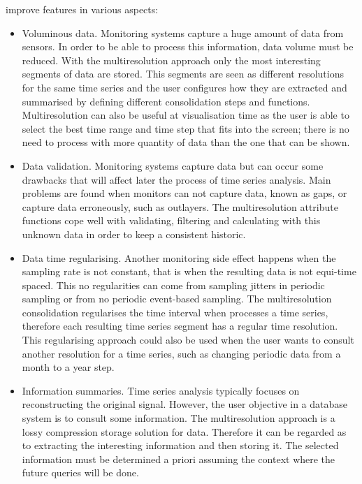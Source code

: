  improve  features in various aspects:
\begin{itemize}

\item Voluminous data. Monitoring systems capture a huge amount of
  data from sensors. In order to be able to process this information,
  data volume must be reduced. With the multiresolution approach only
  the most interesting segments of data are stored. This segments are
  seen as different resolutions for the same time series and the user
  configures how they are extracted and summarised by defining
  different consolidation steps and functions. Multiresolution can
  also be useful at visualisation time as the user is able to select
  the best time range and time step that fits into the screen; there
  is no need to process with more quantity of data than the one that
  can be shown.%

\item Data validation. Monitoring systems capture data but can occur
  some drawbacks that will affect later the process of time series
  analysis. Main problems are found when monitors can not capture
  data, known as gaps, or capture data erroneously, such as outlayers.
  The multiresolution attribute functions cope well with validating,
  filtering and calculating with this unknown data in order to keep a
  consistent historic.%

\item Data time regularising. Another monitoring side effect happens
  when the sampling rate is not constant, that is when the resulting
  data is not equi-time spaced. This no regularities can come from
  sampling jitters in periodic sampling or from no periodic
  event-based sampling. The multiresolution consolidation regularises
  the time interval when processes a time series, therefore each
  resulting time series segment has a regular time resolution. This
  regularising approach could also be used when the user wants to
  consult another resolution for a time series, such as changing
  periodic data from a month to a year step. %

\item Information summaries. Time series analysis typically focuses on
  reconstructing the original signal. However, the user objective in a
  database system is to consult some information. The multiresolution
  approach is a lossy compression storage solution for data. Therefore
  it can be regarded as to extracting the interesting information and
  then storing it. The selected information must be determined a
  priori assuming the context where the future queries will be done.
\end{itemize}


